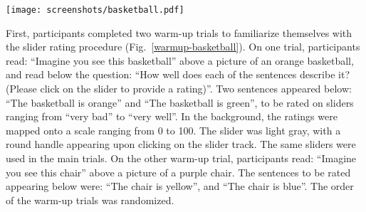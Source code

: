 \begin{figure*}[t]
	\begin{center}
		\texttt{[image: screenshots/basketball.pdf]}
	\end{center}
	\vspace{-1cm}
	\caption{Example view of the sentence rating warm-up trial wherein participants rated sentences about the depicted basketball. }
	\label{warmup-basketball}
\end{figure*}
First, participants completed two warm-up trials to familiarize themselves with the slider rating procedure (Fig.~\ref{warmup-basketball}). On one trial, participants read: “Imagine you see this basketball” above a picture of an orange basketball, and read below the question: “How well does each of the sentences describe it? (Please click on the slider to provide a rating)”. Two sentences appeared below: “The basketball is orange” and “The basketball is green”, to be rated on sliders ranging from “very bad” to “very well”. In the background, the ratings were mapped onto a scale ranging from 0 to 100. The slider was light gray, with a round handle appearing upon clicking on the slider track. The same sliders were used in the main trials. On the other warm-up trial, participants read: “Imagine you see this chair” above a picture of a purple chair. The sentences to be rated appearing below were: “The chair is yellow”, and “The chair is blue”. The order of the warm-up trials was randomized.    

